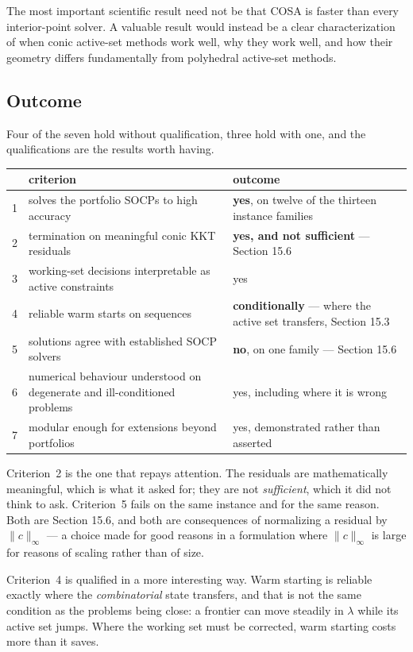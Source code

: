 \documentclass[11pt,a4paper]{article}
\begin{document}
The most important scientific result need not be that COSA is faster
than every interior-point solver. A valuable result would instead be
a clear characterization of when conic active-set methods work well,
why they work well, and how their geometry differs fundamentally from
polyhedral active-set methods.

\subsection{Outcome}

Four of the seven hold without qualification, three hold with one,
and the qualifications are the results worth having.

\begin{center}
\begin{tabular}{clp{5.4cm}}
\hline
& criterion & outcome\\
\hline
1 & solves the portfolio SOCPs to high accuracy & \textbf{yes},
on twelve of the thirteen instance families\\
2 & termination on meaningful conic KKT residuals & \textbf{yes, and
not sufficient} --- Section 15.6\\
3 & working-set decisions interpretable as active constraints &
yes\\
4 & reliable warm starts on sequences & \textbf{conditionally} ---
where the active set transfers, Section 15.3\\
5 & solutions agree with established SOCP solvers & \textbf{no}, on
one family --- Section 15.6\\
6 & numerical behaviour understood on degenerate and
ill-conditioned problems & yes, including where it is wrong\\
7 & modular enough for extensions beyond portfolios & yes,
demonstrated rather than asserted\\
\hline
\end{tabular}
\end{center}

Criterion~2 is the one that repays attention. The residuals are
mathematically meaningful, which is what it asked for; they are not
\emph{sufficient}, which it did not think to ask. Criterion~5 fails on
the same instance and for the same reason. Both are Section 15.6, and
both are consequences of normalizing a residual by $\|c\|_\infty$ ---
a choice made for good reasons in a formulation where $\|c\|_\infty$
is large for reasons of scaling rather than of size.

Criterion~4 is qualified in a more interesting way. Warm starting is
reliable exactly where the \emph{combinatorial} state transfers, and
that is not the same condition as the problems being close: a frontier
can move steadily in $\lambda$ while its active set jumps. Where the
working set must be corrected, warm starting costs more than it saves.
\end{document}
